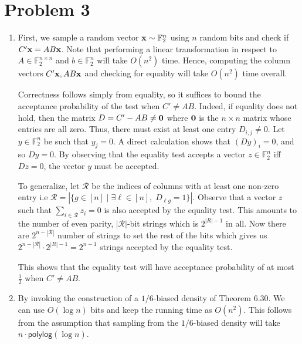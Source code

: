 \documentclass[12pt]{article}%
\newcommand{\F}{\mathbb{F}}
\newcommand{\bx}{{\bf x}}
\newcommand{\Fn}{\mathbb{F}_2^n}
\begin{document}
\section*{Problem 3}
\begin{enumerate}
  \item First, we sample a random vector $\bx \sim \Fn$ using $n$ random bits and check if $C'\bx = AB\bx$. Note that performing a linear transformation in respect to $A \in \F_2^{n \times n}$ and $b \in \Fn$  will take $O(n^2)$ time. Hence, computing the column vectors $C'\bx, AB\bx$ and checking for equality will take $O(n^2)$ time overall.

  Correctness follows simply from equality, so it suffices to bound the acceptance probability of the test when $C' \neq AB$. Indeed, if equality does not hold, then the matrix  $D = C' - AB \neq {\bf 0}$ where ${\bf 0}$ is the $n \times n$ matrix whose entries are all zero. Thus, there must exist at least one entry $D_{i,j} \neq 0$. Let $y \in \Fn$ be such that $y_j = 0$. A direct calculation shows that $(Dy)_i = 0$, and so $Dy = 0$. By observing that the equality test accepts a vector $z \in \Fn$ iff $Dz = 0$, the vector $y$ must be accepted.

  To generalize, let $\mathcal{R}$ be the indices of columns with at least one non-zero entry i.e $\mathcal{R} = |\{g \in [n] \mid \exists \ell \in [n], \; D_{\ell g} = 1\}|$. Observe that a vector $z$ such that $\sum_{i \in \mathcal{R}} z_i = 0$ is also accepted by the equality test. This amounts to the number of even parity, $|\mathcal{R}|$-bit strings which is $2^{|R|-1}$ in all. Now there are $2^{n  - |\mathcal{R}|}$ number of strings to set the rest of the bits which gives us $2^{n - |\mathcal{R}|} \cdot 2^{|R|-1} = 2^{n - 1}$ strings accepted by the equality test.


  This shows that the equality test will have acceptance probability of at most $\frac{1}{2}$ when $C' \neq AB$.

  \item
  By invoking the construction of a $1/6$-biased density of Theorem 6.30. We can use $O(\log{n})$ bits and keep the running time as $O(n^2)$. This follows from the assumption that sampling from the $1/6$-biased density will take $n \cdot \mathsf{polylog}(\log{n})$.

\end{enumerate}
\end{document}
